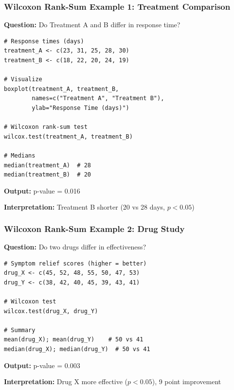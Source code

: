 \documentclass{beamer}
\begin{document}
\begin{frame}[fragile]
\frametitle{Wilcoxon Rank-Sum Example 1: Treatment Comparison}
\textbf{Question:} Do Treatment A and B differ in response time?

\vspace{0.2cm}
\begin{footnotesize}
\begin{verbatim}
# Response times (days)
treatment_A <- c(23, 31, 25, 28, 30)
treatment_B <- c(18, 22, 20, 24, 19)

# Visualize
boxplot(treatment_A, treatment_B,
        names=c("Treatment A", "Treatment B"),
        ylab="Response Time (days)")

# Wilcoxon rank-sum test
wilcox.test(treatment_A, treatment_B)

# Medians
median(treatment_A)  # 28
median(treatment_B)  # 20
\end{verbatim}
\end{footnotesize}

\textbf{Output:} p-value = 0.016

\textbf{Interpretation:} Treatment B shorter (20 vs 28 days, $p < 0.05$)
\end{frame}

\begin{frame}[fragile]
\frametitle{Wilcoxon Rank-Sum Example 2: Drug Study}
\textbf{Question:} Do two drugs differ in effectiveness?

\vspace{0.2cm}
\begin{footnotesize}
\begin{verbatim}
# Symptom relief scores (higher = better)
drug_X <- c(45, 52, 48, 55, 50, 47, 53)
drug_Y <- c(38, 42, 40, 45, 39, 43, 41)

# Wilcoxon test
wilcox.test(drug_X, drug_Y)

# Summary
mean(drug_X); mean(drug_Y)    # 50 vs 41
median(drug_X); median(drug_Y)  # 50 vs 41
\end{verbatim}
\end{footnotesize}

\textbf{Output:} p-value = 0.003

\textbf{Interpretation:} Drug X more effective ($p < 0.05$), 9 point improvement
\end{frame}
\end{document}
